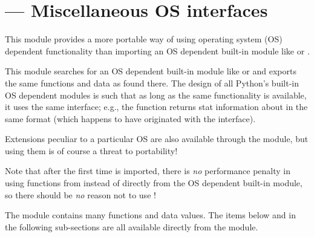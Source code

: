 \section{ ---
         Miscellaneous OS interfaces}



This module provides a more portable way of using operating system
(OS) dependent functionality than importing an OS dependent built-in
module like  or .

This module searches for an OS dependent built-in module like
 or  and exports the same functions and data
as found there.  The design of all Python's built-in OS dependent
modules is such that as long as the same functionality is available,
it uses the same interface; e.g., the function
 returns stat information about  in
the same format (which happens to have originated with the
\POSIX{} interface).

Extensions peculiar to a particular OS are also available through the
 module, but using them is of course a threat to
portability!

Note that after the first time  is imported, there is
\emph{no} performance penalty in using functions from 
instead of directly from the OS dependent built-in module, so there
should be \emph{no} reason not to use !


%
\ifhtml
The  module contains many functions and data values.
The items below and in the following sub-sections are all available
directly from the  module.
\fi



